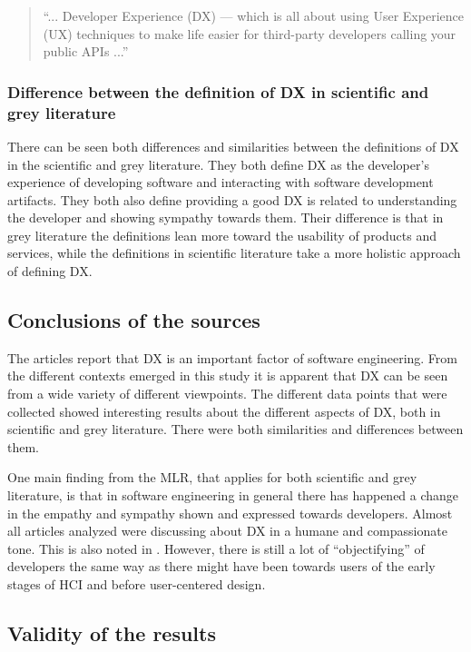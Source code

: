 \documentclass[english, 12pt, a4paper, sci, utf8, a-1b, online]{aaltothesis}
\begin{document}
\begin{quote}
  ``... Developer Experience (DX) — which is all about using User Experience (UX) techniques to make life easier for third-party developers calling your public APIs ...'' \parencite{4-must-read-articles-on-developer-experience}
\end{quote}

\subsubsection{Difference between the definition of DX in scientific and grey literature}

There can be seen both differences and similarities between the definitions of DX in the scientific and grey literature. They both define DX as the developer's experience of developing software and interacting with software development artifacts. They both also define providing a good DX is related to understanding the developer and showing sympathy towards them. Their difference is that in grey literature the definitions lean more toward the usability of products and services, while the definitions in scientific literature take a more holistic approach of defining DX.

\subsection{Conclusions of the sources}

The articles report that DX is an important factor of software engineering. From the different contexts emerged in this study it is apparent that DX can be seen from a wide variety of different viewpoints. The different data points that were collected showed interesting results about the different aspects of DX, both in scientific and grey literature. There were both similarities and differences between them.

One main finding from the MLR, that applies for both scientific and grey literature, is that in software engineering in general there has happened a change in the empathy and sympathy shown and expressed towards developers. Almost all articles analyzed were discussing about DX in a humane and compassionate tone. This is also noted in \textcite{voice-of-the-developer}. However, there is still a lot of ``objectifying'' of developers the same way as there might have been towards users of the early stages of HCI and before user-centered design.

\subsection{Validity of the results}
\end{document}

